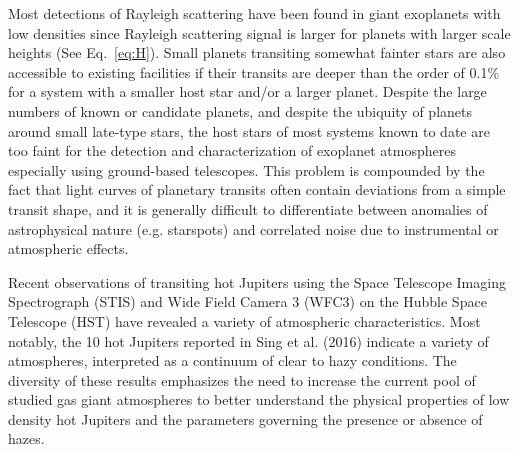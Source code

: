 Most detections of Rayleigh scattering have been found in giant exoplanets with low densities since Rayleigh scattering signal is larger for planets with larger scale heights (See Eq.~\ref{eq:H}). Small planets transiting somewhat fainter stars are also accessible to existing facilities if their transits are deeper than the order of 0.1\% for a system with a smaller host star and/or a larger planet. Despite the large numbers of known or candidate planets, and despite the ubiquity of planets around small late-type stars, the host stars of most systems known to date are too faint for the detection and characterization of exoplanet atmospheres especially using ground-based telescopes.
This problem is compounded by the fact that light curves of planetary transits often contain deviations from a simple transit shape, and it is generally difficult to differentiate between anomalies of astrophysical nature (e.g. starspots) and correlated noise due to instrumental or atmospheric effects.


Recent observations of transiting hot Jupiters using the Space Telescope Imaging Spectrograph (STIS) and Wide Field Camera 3 (WFC3) on the Hubble Space Telescope (HST) have revealed a variety of atmospheric characteristics. Most notably, the 10 hot Jupiters reported in Sing et al. (2016) 
indicate a variety of atmospheres, interpreted as a continuum of clear to hazy conditions. The diversity of these results emphasizes the need to increase the current pool of studied gas giant atmospheres to better understand the physical properties of low density hot Jupiters and the parameters governing the presence or absence of hazes. 


